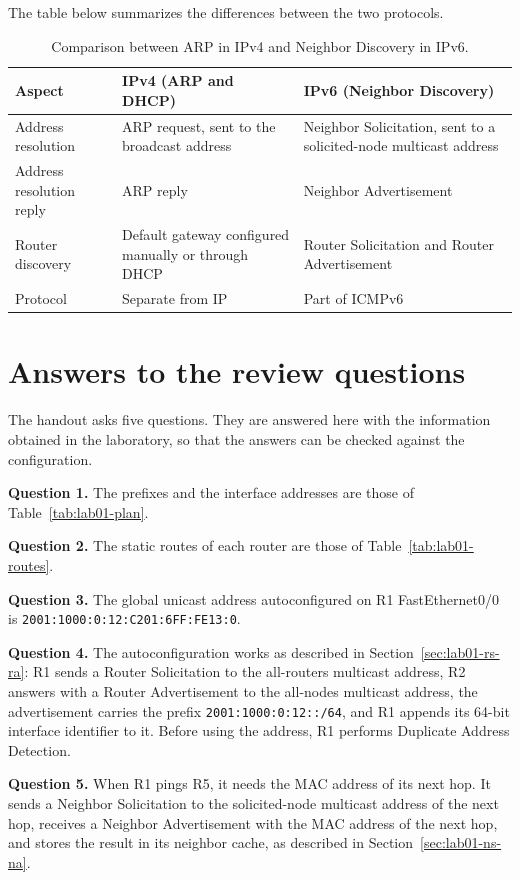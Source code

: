 The table below summarizes the differences between the two protocols.

\begin{table}[h]
\centering
\begin{tabular}{@{}lp{5.6cm}p{5.6cm}@{}}
\toprule
\textbf{Aspect} & \textbf{IPv4 (ARP and DHCP)} & \textbf{IPv6 (Neighbor Discovery)} \\
\midrule
Address resolution & ARP request, sent to the broadcast address & Neighbor Solicitation, sent to a solicited-node multicast address \\
Address resolution reply & ARP reply & Neighbor Advertisement \\
Router discovery & Default gateway configured manually or through DHCP & Router Solicitation and Router Advertisement \\
Protocol & Separate from IP & Part of ICMPv6 \\
\bottomrule
\end{tabular}
\caption{Comparison between ARP in IPv4 and Neighbor Discovery in IPv6.}
\end{table}

\section{Answers to the review questions}

The handout asks five questions. They are answered here with the information obtained in the laboratory, so that the answers can be checked against the configuration.

\textbf{Question 1.} The prefixes and the interface addresses are those of Table~\ref{tab:lab01-plan}.

\textbf{Question 2.} The static routes of each router are those of Table~\ref{tab:lab01-routes}.

\textbf{Question 3.} The global unicast address autoconfigured on R1 FastEthernet0/0 is \texttt{2001:1000:0:12:C201:6FF:FE13:0}.

\textbf{Question 4.} The autoconfiguration works as described in Section~\ref{sec:lab01-rs-ra}: R1 sends a Router Solicitation to the all-routers multicast address, R2 answers with a Router Advertisement to the all-nodes multicast address, the advertisement carries the prefix \texttt{2001:1000:0:12::/64}, and R1 appends its 64-bit interface identifier to it. Before using the address, R1 performs Duplicate Address Detection.

\textbf{Question 5.} When R1 pings R5, it needs the MAC address of its next hop. It sends a Neighbor Solicitation to the solicited-node multicast address of the next hop, receives a Neighbor Advertisement with the MAC address of the next hop, and stores the result in its neighbor cache, as described in Section~\ref{sec:lab01-ns-na}.

